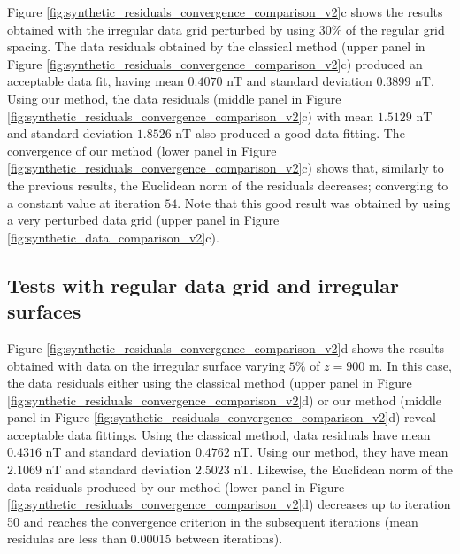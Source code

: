 \documentclass[manuscript,noblind]{geophysics}
\begin{document}
Figure \ref{fig:synthetic_residuals_convergence_comparison_v2}c shows the results obtained
with the irregular data grid perturbed by using $30\%$ of the regular grid spacing.
The data residuals 
obtained by the classical method (upper panel in Figure \ref{fig:synthetic_residuals_convergence_comparison_v2}c) produced an acceptable data fit, having mean 
$0.4070$ nT and standard deviation $0.3899$ nT. 
%
%
Using our method, the data residuals (middle panel in Figure 
\ref{fig:synthetic_residuals_convergence_comparison_v2}c) with mean $1.5129$ nT and 
standard deviation $1.8526$ nT also produced a good data fitting.
The convergence of our method (lower panel in Figure 
\ref{fig:synthetic_residuals_convergence_comparison_v2}c) shows that, 
similarly to the previous results, the Euclidean norm of the residuals decreases; converging 
to a constant value at iteration $54$. Note that this good result was obtained by 
using a very perturbed data grid (upper panel in Figure \ref{fig:synthetic_data_comparison_v2}c).
%

\subsection*{Tests with regular data grid and irregular surfaces}

Figure \ref{fig:synthetic_residuals_convergence_comparison_v2}d shows the results obtained
with data on the irregular surface varying $5\%$ of $z = 900$ m.
In this case, the data residuals either using the classical method 
(upper panel in Figure \ref{fig:synthetic_residuals_convergence_comparison_v2}d) or
our method (middle panel in Figure \ref{fig:synthetic_residuals_convergence_comparison_v2}d) reveal
acceptable data fittings.
Using the classical method, data residuals have mean $0.4316$ nT and standard deviation $0.4762$ nT.
Using our method, they have mean $2.1069$ nT and standard deviation $2.5023$ nT. 
Likewise, the Euclidean norm of the data residuals produced by our method 
(lower panel in Figure \ref{fig:synthetic_residuals_convergence_comparison_v2}d) decreases up to 
iteration 50 and reaches the convergence criterion in the subsequent iterations (mean residulas are less than 
0.00015 between iterations).
\end{document}
